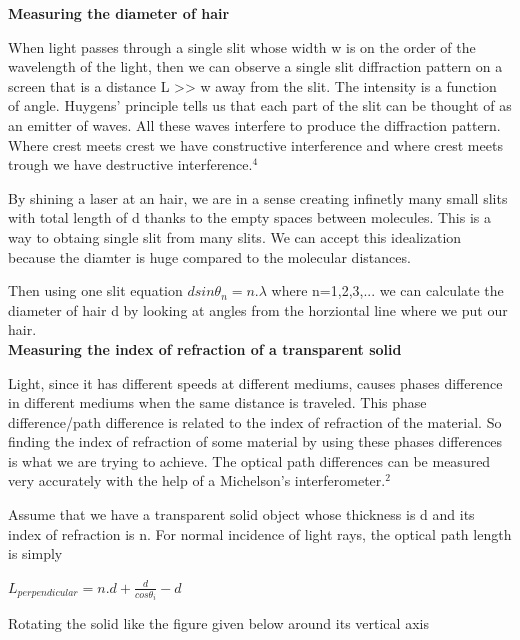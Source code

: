 \documentclass[10pt,a4paper]{article}
\begin{document}
{\begin{figure}[H]
\begin{center}
	\end{center}
\end{figure}
\textbf{\small{Measuring the diameter of hair}}
\par When light passes through a single slit whose width w is on the order of the wavelength of the light, then we can observe a single slit diffraction pattern on a screen that is a distance L >> w away from the slit.  The intensity is a function of angle.  Huygens' principle tells us that each part of the slit can be thought of as an emitter of waves.  All these waves interfere to produce the diffraction pattern.  Where crest meets crest we have constructive interference and where crest meets trough we have destructive interference.$^4$
\par By shining a laser at an hair, we are in a sense creating infinetly many small slits with total length of d thanks to the empty spaces between molecules. This is a way to obtaing single slit from many slits. We can accept this idealization because the diamter is huge compared to the molecular distances.
\par Then using one slit equation $dsin\theta_n=n.\lambda$ where n=1,2,3,... we can calculate the diameter of hair d by looking at angles from the horziontal line where we put our hair.
\\[\baselineskip]
\textbf{\small{Measuring the index of refraction of a transparent solid}}
\par Light, since it has different speeds at different mediums, causes phases difference in different mediums when the same distance is traveled. This phase difference/path difference is related to the index of refraction of the material. So finding the index of refraction of some material by using these phases differences is what we are trying to achieve. The optical path differences can be measured very accurately with the help of a Michelson's interferometer.$^2$
\par Assume that we have a transparent solid object whose thickness is d and its index of refraction is n. For normal incidence of light rays, the optical path length is simply
\par$L_{perpendicular}=n.d+\frac{d}{cos\theta_i}-d$
\par Rotating the solid like the figure given below around its vertical axis
\begin{figure}[H]
	\begin{center}

\end{center}
\end{figure}}
\end{document}
